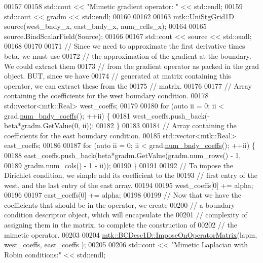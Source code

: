\begin{DoxyCode}
00157 
00158   std::cout << \textcolor{stringliteral}{"Mimetic gradient operator: "} << std::endl;
00159   std::cout << gradm << std::endl;
00160 
00162 
00163   \hyperlink{classmtk_1_1UniStgGrid1D}{mtk::UniStgGrid1D} source(west\_bndy\_x, east\_bndy\_x, num\_cells\_x);
00164 
00165   source.BindScalarField(Source);
00166 
00167   std::cout << source << std::endl;
00168 
00170 
00171   \textcolor{comment}{// Since we need to approximate the first derivative times beta, we must use}
00172   \textcolor{comment}{// the approximation of the gradient at the boundary. We could extract them}
00173   \textcolor{comment}{// from the gradient operator as packed in the grad object. BUT, since we have}
00174   \textcolor{comment}{// generated at matrix containing this operator, we can extract these from the}
00175   \textcolor{comment}{// matrix.}
00176 
00177   \textcolor{comment}{// Array containing the coefficients for the west boundary condition.}
00178   std::vector<mtk::Real> west\_coeffs;
00179 
00180   \textcolor{keywordflow}{for} (\textcolor{keyword}{auto} ii = 0; ii < grad.\hyperlink{classmtk_1_1Grad1D_a7168205c21ba00012558f8bba069c119}{num\_bndy\_coeffs}(); ++ii) \{
00181     west\_coeffs.push\_back(-beta*gradm.GetValue(0, ii));
00182   \}
00183 
00184   \textcolor{comment}{// Array containing the coefficients for the east boundary condition.}
00185   std::vector<mtk::Real> east\_coeffs;
00186 
00187   \textcolor{keywordflow}{for} (\textcolor{keyword}{auto} ii = 0; ii < grad.\hyperlink{classmtk_1_1Grad1D_a7168205c21ba00012558f8bba069c119}{num\_bndy\_coeffs}(); ++ii) \{
00188     east\_coeffs.push\_back(beta*gradm.GetValue(gradm.num\_rows() - 1,
00189                                               gradm.num\_cols() - 1 - ii));
00190   \}
00191 
00192   \textcolor{comment}{// To impose the Dirichlet condition, we simple add its coefficient to the}
00193   \textcolor{comment}{// first entry of the west, and the last entry of the east array.}
00194 
00195   west\_coeffs[0] += alpha;
00196 
00197   east\_coeffs[0] += alpha;
00198 
00199   \textcolor{comment}{// Now that we have the coefficients that should be in the operator, we create}
00200   \textcolor{comment}{// a boundary condition descriptor object, which will encapsulate the}
00201   \textcolor{comment}{// complexity of assigning them in the matrix, to complete the construction of}
00202   \textcolor{comment}{// the mimetic operator.}
00203 
00204   \hyperlink{classmtk_1_1BCDesc1D_a5e5dcda1780b9aa404e836c4c27ac08f}{mtk::BCDesc1D::ImposeOnOperatorMatrix}(lapm, west\_coeffs, east\_coeffs
      );
00205 
00206   std::cout << \textcolor{stringliteral}{"Mimetic Laplacian with Robin conditions:"} << std::endl;

\end{DoxyCode}
